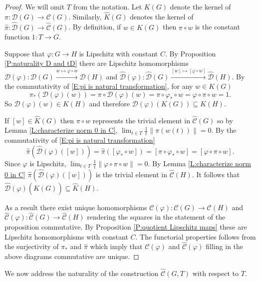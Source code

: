 \documentclass[12pt]{amsart}
\theoremstyle{definition}
\newcommand{\C}[1]{\mathcal{#1}}
\newcommand{\xto}[1]{\xrightarrow{#1}}
\def\Free{F}
\def\D{\mathcal{D}}
\def\tC{\hat{\mathcal{C}}}
\def\tD{\hat{\D}}
\begin{document}
\begin{proof}
We will omit $T$ from the notation.
Let $K(G)$ denote the kernel of $\pi \colon \C D(G) \to \C C(G)$.
Similarly, $\hat{K}(G)$ denotes the kernel of $\hat{\pi} \colon \tD(G) \to \tC(G)$.
By definition, if $w \in K(G)$ then $\pi \circ w$ is the constant function $1 \colon T \to G$.

Suppose that $\varphi \colon G \to H$ is Lipschitz with constant $C$.
By Proposition \ref{P:naturality D and tD} there are Lipschitz homomorphisms $\C D(\varphi) \colon \C D(G) \xto{w \mapsto \varphi \circ w} \C D(H)$ and $\tD(\varphi) \colon \tD(G) \xto{[w] \mapsto [\varphi \circ w]} \tD(H)$.
By the commutativity of \eqref{E:pi is natural transformation}, for any $w \in K(G)$
\[
\pi_* (\C D(\varphi)(w)) = \pi \circ \C D(\varphi)(w) = \pi \circ \varphi_* \circ w   = \varphi \circ \pi \circ w = 1.
\]
So $\C D(\varphi)(w) \in K(H)$ and therefore $\C D(\varphi)(K(G)) \subseteq K(H)$.

If $[w] \in \hat{K}(G)$ then $\pi \circ w$ represents the trivial element in $\tC(G)$ so by Lemma \ref{L:characterize norm 0 in C}, $\lim_{t \in T} \tfrac{1}{t} \| \pi(w(t))\|=0$.
By the commutativity of \eqref{E:pi is natural transformation}
\[
\hat{\pi}(\tD(\varphi)([w])) = 
\hat{\pi}([\varphi_* \circ w]) =
[\pi \circ \varphi_* \circ w] =
[\varphi \circ \pi \circ w].
\]
Since $\varphi$ is Lipschitz, $\lim_{t \in T} \tfrac{1}{t} \| \varphi \circ \pi \circ w\| =0$. 
By Lemma \ref{L:characterize norm 0 in C} $\hat{\pi}(\tD(\varphi)([w]))$ is the trivial element in $\tC(H)$.
It follows that $\tD(\varphi)(\hat{K}(G)) \subseteq \hat{K}(H)$.

As a result there exist unique homomorphisms $\C C(\varphi) \colon\C C(G) \to \C C(H)$ and $\tC(\varphi) \colon \tC(G) \to \tC(H)$ rendering the  squares in the statement of the proposition commutative.
By Proposition \ref{P:quotient Lipschitz maps} these are Lipschitz homomorphisms with constant $C$.
The functorial properties follows from the surjectivity of $\pi_*$ and $\hat{\pi}$ which imply that $\C C(\varphi)$ and $\tC(\varphi)$ filling in the above diagrams commutative are unique.
\end{proof}



We now address the naturality of the construction $\tC(G,T)$ with respect to $T$.
\end{document}
